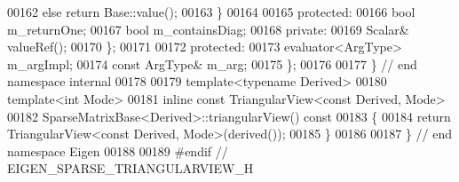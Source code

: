 \begin{DoxyCode}
00162         \textcolor{keywordflow}{else}                            \textcolor{keywordflow}{return} Base::value();
00163       \}
00164 
00165     \textcolor{keyword}{protected}:
00166       \textcolor{keywordtype}{bool} m\_returnOne;
00167       \textcolor{keywordtype}{bool} m\_containsDiag;
00168     \textcolor{keyword}{private}:
00169       Scalar& valueRef();
00170   \};
00171   
00172 \textcolor{keyword}{protected}:
00173   evaluator<ArgType> m\_argImpl;
00174   \textcolor{keyword}{const} ArgType& m\_arg;
00175 \};
00176 
00177 \} \textcolor{comment}{// end namespace internal}
00178 
00179 \textcolor{keyword}{template}<\textcolor{keyword}{typename} Derived>
00180 \textcolor{keyword}{template}<\textcolor{keywordtype}{int} Mode>
00181 \textcolor{keyword}{inline} \textcolor{keyword}{const} TriangularView<const Derived, Mode>
00182 SparseMatrixBase<Derived>::triangularView()\textcolor{keyword}{ const}
00183 \textcolor{keyword}{}\{
00184   \textcolor{keywordflow}{return} TriangularView<const Derived, Mode>(derived());
00185 \}
00186 
00187 \} \textcolor{comment}{// end namespace Eigen}
00188 
00189 \textcolor{preprocessor}{#endif // EIGEN\_SPARSE\_TRIANGULARVIEW\_H}
\end{DoxyCode}
